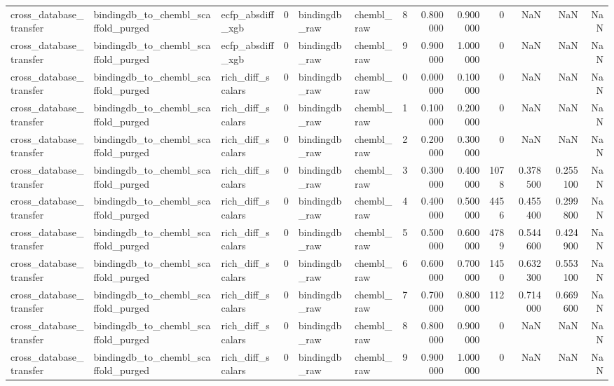 \begin{longtable}{lllrllrrrrrrr}
cross\_database\_transfer & bindingdb\_to\_chembl\_scaffold\_purged & ecfp\_absdiff\_xgb & 0 & bindingdb\_raw & chembl\_raw & 8 & 0.800000 & 0.900000 & 0 & NaN & NaN & NaN \\
cross\_database\_transfer & bindingdb\_to\_chembl\_scaffold\_purged & ecfp\_absdiff\_xgb & 0 & bindingdb\_raw & chembl\_raw & 9 & 0.900000 & 1.000000 & 0 & NaN & NaN & NaN \\
cross\_database\_transfer & bindingdb\_to\_chembl\_scaffold\_purged & rich\_diff\_scalars & 0 & bindingdb\_raw & chembl\_raw & 0 & 0.000000 & 0.100000 & 0 & NaN & NaN & NaN \\
cross\_database\_transfer & bindingdb\_to\_chembl\_scaffold\_purged & rich\_diff\_scalars & 0 & bindingdb\_raw & chembl\_raw & 1 & 0.100000 & 0.200000 & 0 & NaN & NaN & NaN \\
cross\_database\_transfer & bindingdb\_to\_chembl\_scaffold\_purged & rich\_diff\_scalars & 0 & bindingdb\_raw & chembl\_raw & 2 & 0.200000 & 0.300000 & 0 & NaN & NaN & NaN \\
cross\_database\_transfer & bindingdb\_to\_chembl\_scaffold\_purged & rich\_diff\_scalars & 0 & bindingdb\_raw & chembl\_raw & 3 & 0.300000 & 0.400000 & 1078 & 0.378500 & 0.255100 & NaN \\
cross\_database\_transfer & bindingdb\_to\_chembl\_scaffold\_purged & rich\_diff\_scalars & 0 & bindingdb\_raw & chembl\_raw & 4 & 0.400000 & 0.500000 & 4456 & 0.455400 & 0.299800 & NaN \\
cross\_database\_transfer & bindingdb\_to\_chembl\_scaffold\_purged & rich\_diff\_scalars & 0 & bindingdb\_raw & chembl\_raw & 5 & 0.500000 & 0.600000 & 4789 & 0.544600 & 0.424900 & NaN \\
cross\_database\_transfer & bindingdb\_to\_chembl\_scaffold\_purged & rich\_diff\_scalars & 0 & bindingdb\_raw & chembl\_raw & 6 & 0.600000 & 0.700000 & 1450 & 0.632300 & 0.553100 & NaN \\
cross\_database\_transfer & bindingdb\_to\_chembl\_scaffold\_purged & rich\_diff\_scalars & 0 & bindingdb\_raw & chembl\_raw & 7 & 0.700000 & 0.800000 & 112 & 0.714000 & 0.669600 & NaN \\
cross\_database\_transfer & bindingdb\_to\_chembl\_scaffold\_purged & rich\_diff\_scalars & 0 & bindingdb\_raw & chembl\_raw & 8 & 0.800000 & 0.900000 & 0 & NaN & NaN & NaN \\
cross\_database\_transfer & bindingdb\_to\_chembl\_scaffold\_purged & rich\_diff\_scalars & 0 & bindingdb\_raw & chembl\_raw & 9 & 0.900000 & 1.000000 & 0 & NaN & NaN & NaN \\

\end{longtable}
